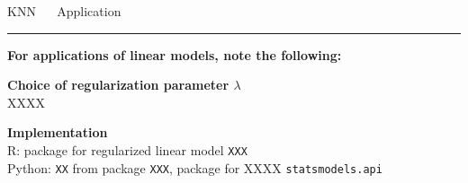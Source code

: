 \documentclass[11pt,compress,t,notes=noshow, xcolor=table]{beamer}
\begin{document}

\LARGE
\begin{frame}{\textcolor{gray!80}{KNN} ~~ Application}
\normalsize
\vspace{-0.5cm}
\noindent \textcolor{gray!80}{\rule{\textwidth}{1pt}}

\vspace{0.3cm}

\footnotesize

\textbf{For applications of linear models, note the following:}

\lz

  \textbf{\textcolor{gray!80}{Choice of regularization parameter  $\lambda$}} \\
  \smallskip
 XXXX
 
 

\lz

  \textbf{\textcolor{gray!80}{Implementation}} \\
  \smallskip
  R: package for regularized linear model \texttt{XXX}\\
  Python: \texttt{XX} from package \texttt{XXX}, package for XXXX \texttt{statsmodels.api}

\end{frame}












\endlecture
\end{document}
